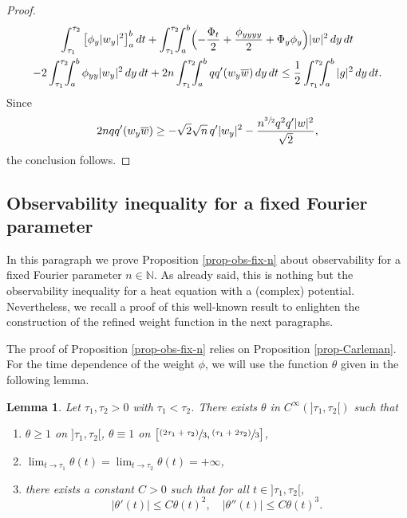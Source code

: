 \documentclass[10pt]{amsart}
\newcommand{\psfrac}[2]{\sfrac{(#1)}{#2}}
\theoremstyle{plain}
\newtheorem{lemma}[theorem]{Lemma}
\theoremstyle{definition}
\newcommand{\abs}[1]{\vert #1\vert}
\newcommand{\1}{\mathds 1}
\let\Im\relax
\DeclareMathOperator{\Im}{\mathsf{Im}\mkern2mu}
\newcommand{\N}{\mathbb{N}}
\let\th\theta
\let\vf\phi
\begin{document}
\begin{proof}
\begin{multline*}
\int_{\tau_1}^{\tau_2} \big[ \phi_y \abs{w_y}^2 \big]_a^b \, dt + \int_{\tau_1}^{\tau_2}\hspace*{-2mm} \int_a^b \Bigl(- \frac {\Phi_t}2 + \frac { \phi_{yyyy}}2 + \Phi_y \phi_y \Bigr) \abs w^2 \, dy \, dt \\
- 2 \int_{\tau_1}^{\tau_2}\hspace*{-2mm} \int_a^b \phi_{yy} \abs{w_y}^2 \, dy \, dt + 2n \int_{\tau_1}^{\tau_2}\hspace*{-2mm} \int_a^b qq' \Im(w_y \overline w) \, dy \, dt \leq \frac 12 \int_{\tau_1}^{\tau_2}\hspace*{-2mm} \int_a^b |g|^2 \, dy \, dt.
\end{multline*}
Since
\[
2n qq' \Im(w_y \overline w) \geq - \sqrt 2 \sqrt n\,q' \abs{w_y}^2 - \frac { n^{\sfrac 32} q^2 q' \abs w^2} {\sqrt 2},
\]
the conclusion follows.
\end{proof}

\subsection{Observability inequality for a fixed Fourier parameter} \label{sec-obs-fixed-n}

In this paragraph we prove Proposition \ref{prop-obs-fix-n} about observability for a fixed Fourier parameter $n \in \N$. As already said, this is nothing but the observability inequality for a heat equation with a (complex) potential. Nevertheless, we recall a proof of this well-known result to enlighten the construction of the refined weight function in the next paragraphs.

The proof of Proposition \ref{prop-obs-fix-n} relies on Proposition \ref{prop-Carleman}. For the time dependence of the weight $\vf$, we will use the function $\th$ given in the following lemma.

\begin{lemma} \label{lemma_def_theta}
Let $\tau_1,\tau_2 > 0$ with $\tau_1<\tau_2$. There exists $\theta$ in $C^\infty(]\tau_1,\tau_2[)$ such that
\begin{enumerate}
\item $\theta \geq 1$ on $]\tau_1,\tau_2[$, $\theta \equiv 1$ on $\big[\psfrac{2\tau_1 + \tau_2}{3},\psfrac{\tau_1 + 2\tau_2}{3} \big]$,
\item $\lim_{t \rightarrow \tau_1} \theta(t) = \lim_{t \rightarrow \tau_2} \theta(t)= + \infty$,
\item there exists a constant $C>0$ such that for all $t \in{}]\tau_1,\tau_2[$,
\[
\vert \theta'(t) \vert \leq C \theta(t)^2, \quad \vert \theta''(t) \vert \leq C \theta(t)^3.
\]
\end{enumerate}
\end{lemma}
\end{document}

